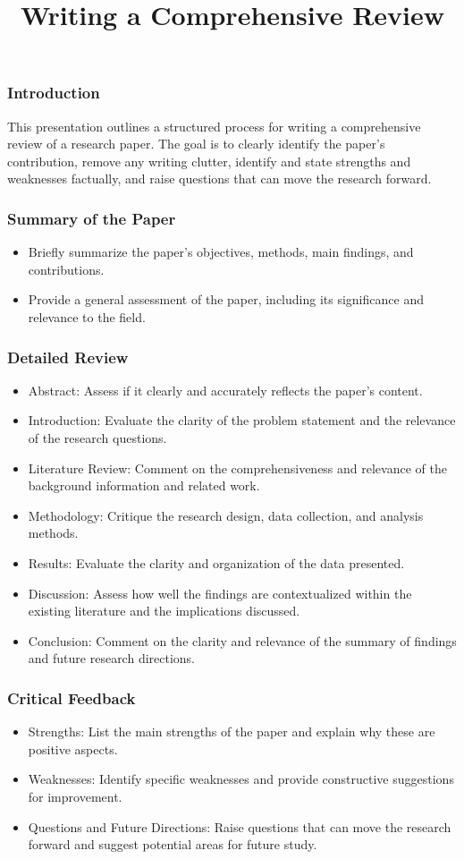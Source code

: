 \documentclass{beamer}
\title{Writing a Comprehensive Review}
\author{}
\date{}
\begin{document}
\frame{\titlepage}

\begin{frame}
\frametitle{Introduction}
This presentation outlines a structured process for writing a comprehensive review of a research paper. The goal is to clearly identify the paper's contribution, remove any writing clutter, identify and state strengths and weaknesses factually, and raise questions that can move the research forward.
\end{frame}

\begin{frame}
\frametitle{Summary of the Paper}
\begin{itemize}
    \item Briefly summarize the paper’s objectives, methods, main findings, and contributions.
    \item Provide a general assessment of the paper, including its significance and relevance to the field.
\end{itemize}
\end{frame}

\begin{frame}
\frametitle{Detailed Review}
\begin{itemize}
    \item Abstract: Assess if it clearly and accurately reflects the paper’s content.
    \item Introduction: Evaluate the clarity of the problem statement and the relevance of the research questions.
    \item Literature Review: Comment on the comprehensiveness and relevance of the background information and related work.
    \item Methodology: Critique the research design, data collection, and analysis methods.
    \item Results: Evaluate the clarity and organization of the data presented.
    \item Discussion: Assess how well the findings are contextualized within the existing literature and the implications discussed.
    \item Conclusion: Comment on the clarity and relevance of the summary of findings and future research directions.
\end{itemize}
\end{frame}

\begin{frame}
\frametitle{Critical Feedback}
\begin{itemize}
    \item Strengths: List the main strengths of the paper and explain why these are positive aspects.
    \item Weaknesses: Identify specific weaknesses and provide constructive suggestions for improvement.
    \item Questions and Future Directions: Raise questions that can move the research forward and suggest potential areas for future study.
\end{itemize}
\end{frame}
\end{document}

